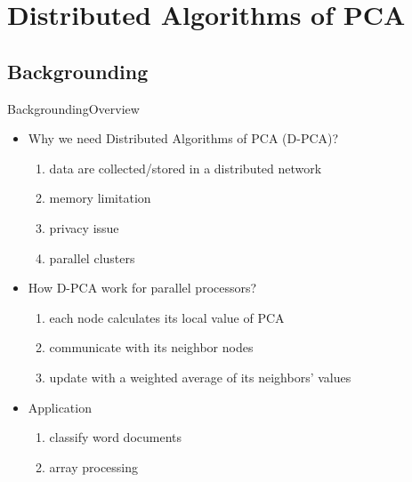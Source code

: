 \documentclass{beamer}
\begin{document}
\section{Distributed Algorithms of PCA}

\subsection{Backgrounding}


\begin{frame}{Backgrounding}{Overview}
	 \begin{itemize}
	 	\item{
	 	Why we need Distributed Algorithms of PCA (D-PCA)?
	 	}
	 	\begin{enumerate}
  			\item data are collected/stored in a distributed network
  			\item memory limitation
  			\item privacy issue
  			\item parallel clusters
		\end{enumerate}
		
		\item{
		How D-PCA work for parallel processors?
		\begin{enumerate}
  			\item each node calculates its local value of PCA
  			\item communicate with its neighbor nodes
  			\item update with a weighted average of its neighbors’ values
		\end{enumerate}
		}
		\item{
		Application
		\begin{enumerate}
  			\item classify word documents
  			\item array processing
		\end{enumerate}

		}
	 \end{itemize}

\end{frame}
\end{document}
